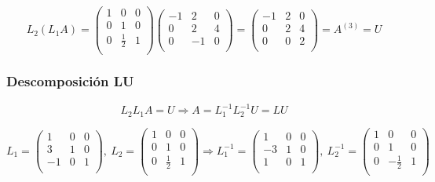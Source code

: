 $$ L_{2}(L_{1}A) =
	\begin{pmatrix}
        1 & 0 & 0\\
        0 & 1 & 0\\
        0 & \frac{1}{2} & 1\\
	\end{pmatrix}
	\begin{pmatrix}
       -1 & 2 & 0\\
        0 & 2 & 4\\
        0 & -1 & 0\\
	\end{pmatrix}
	=
	\begin{pmatrix}
       -1 & 2 & 0\\
        0 & 2 & 4\\
        0 & 0 & 2\\
	\end{pmatrix}
	=
	A^{(3)} = U
$$

\subsubsection{Descomposici\'on LU}

$$L_{2}L_{1}A = U \Rightarrow A = L_{1}^{-1}L_{2}^{-1}U = LU$$

$$ L_{1} =
	\begin{pmatrix}
        1 & 0 & 0\\
        3 & 1 & 0\\
        -1 & 0 & 1\\
	\end{pmatrix}
	,\ L_{2} = 
	\begin{pmatrix}
        1 & 0 & 0\\
        0 & 1 & 0\\
        0 & \frac{1}{2} & 1\\
	\end{pmatrix}
	\Rightarrow L_{1}^{-1} = 
	\begin{pmatrix}
        1 & 0 & 0\\
        -3 & 1 & 0\\
       1 & 0 & 1\\
	\end{pmatrix}
	,\ L_{2}^{-1} =
	\begin{pmatrix}
        1 & 0 & 0\\
        0 & 1 & 0\\
        0 & -\frac{1}{2} & 1\\
	\end{pmatrix}
$$


